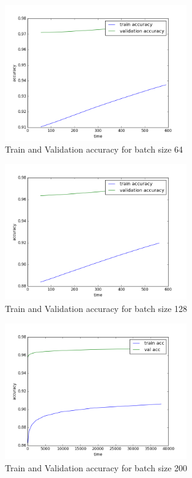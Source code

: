 \documentclass{article}
\begin{document}
\begin{figure}[h]
  \centering
  \includegraphics[width=0.7\textwidth]{keras_lenet/accuracy64.png}
  \caption{Train and Validation accuracy for batch size 64}
\end{figure}

\begin{figure}[h]
  \centering
  \includegraphics[width=0.7\textwidth]{keras_lenet/accuracy128.png}
  \caption{Train and Validation accuracy for batch size 128}
\end{figure}

\begin{figure}[h]
  \centering
  \includegraphics[width=0.7\textwidth]{keras_lenet/accuracy200.png}
  \caption{Train and Validation accuracy for batch size 200}
\end{figure}
\end{document}
